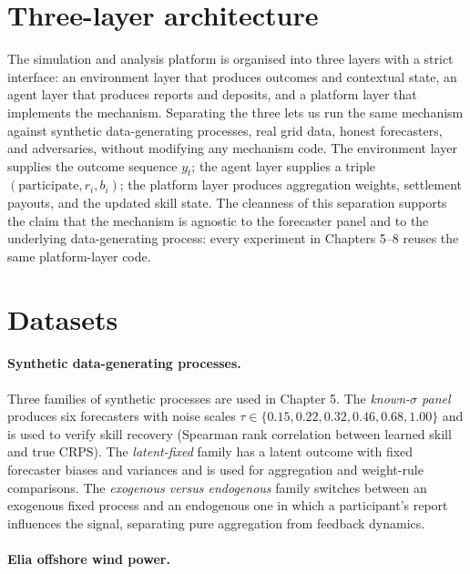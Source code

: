 \documentclass[
  11pt,
  a4paper,
  oneside]{report}
\begin{document}
\section{Three-layer architecture}\label{three-layer-architecture}

The simulation and analysis platform is organised into three layers with
a strict interface: an environment layer that produces outcomes and
contextual state, an agent layer that produces reports and deposits, and
a platform layer that implements the mechanism. Separating the three
lets us run the same mechanism against synthetic data-generating
processes, real grid data, honest forecasters, and adversaries, without
modifying any mechanism code. The environment layer supplies the outcome
sequence \(y_t\); the agent layer supplies a triple
\((\text{participate}, r_i, b_i)\); the platform layer produces
aggregation weights, settlement payouts, and the updated skill state.
The cleanness of this separation supports the claim that the mechanism
is agnostic to the forecaster panel and to the underlying
data-generating process: every experiment in Chapters 5--8 reuses the
same platform-layer code.

\section{Datasets}\label{datasets}

\paragraph{Synthetic data-generating processes.}

Three families of synthetic processes are used in Chapter 5. The
\emph{known-$\sigma$
panel} produces six forecasters with noise scales
\(\tau \in \{0.15, 0.22, 0.32, 0.46, 0.68, 1.00\}\) and is used to
verify skill recovery (Spearman rank correlation between learned skill
and true CRPS). The \emph{latent-fixed} family has a latent outcome with
fixed forecaster biases and variances and is used for aggregation and
weight-rule comparisons. The \emph{exogenous versus
endogenous} family switches between an exogenous fixed process and an
endogenous one in which a participant's report influences the signal,
separating pure aggregation from feedback dynamics.

\paragraph{Elia offshore wind power.}
\end{document}
